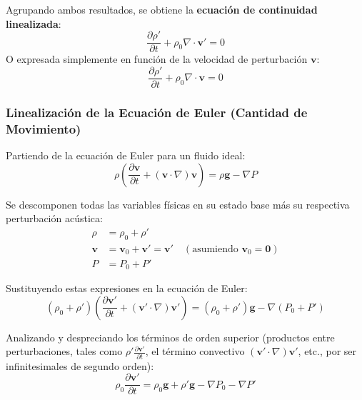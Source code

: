 \documentclass[11pt,letterpaper]{article}
\begin{document}
Agrupando ambos resultados, se obtiene la \textbf{ecuación de continuidad linealizada}:
\begin{equation}
    \frac{\partial \rho'}{\partial t} + \rho_0 \nabla \cdot \mathbf{v}' = 0
\end{equation}
O expresada simplemente en función de la velocidad de perturbación $\mathbf{v}$:
\begin{equation}
    \frac{\partial \rho'}{\partial t} + \rho_0 \nabla \cdot \mathbf{v} = 0
\end{equation}

\subsubsection{Linealización de la Ecuación de Euler (Cantidad de Movimiento)}\label{sec:euler-linealizado}

Partiendo de la ecuación de Euler para un fluido ideal:
\begin{equation}
    \rho \left( \frac{\partial \mathbf{v}}{\partial t} + (\mathbf{v} \cdot \nabla)\mathbf{v} \right) = \rho \mathbf{g} - \nabla P
\end{equation}

Se descomponen todas las variables físicas en su estado base más su respectiva perturbación acústica:
\begin{align}
    \rho &= \rho_0 + \rho' \\
    \mathbf{v} &= \mathbf{v}_0 + \mathbf{v}' = \mathbf{v}' \quad (\text{asumiendo } \mathbf{v}_0 = \mathbf{0}) \\
    P &= P_0 + P'
\end{align}

Sustituyendo estas expresiones en la ecuación de Euler:
\begin{equation}
    (\rho_0 + \rho') \left( \frac{\partial \mathbf{v}'}{\partial t} + (\mathbf{v}' \cdot \nabla)\mathbf{v}' \right) = (\rho_0 + \rho') \mathbf{g} - \nabla (P_0 + P')
\end{equation}

Analizando y despreciando los términos de orden superior (productos entre perturbaciones, tales como $\rho' \frac{\partial \mathbf{v}'}{\partial t}$, el término convectivo $(\mathbf{v}' \cdot \nabla)\mathbf{v}'$, etc., por ser infinitesimales de segundo orden):
\begin{equation}
    \rho_0 \frac{\partial \mathbf{v}'}{\partial t} = \rho_0 \mathbf{g} + \rho'\mathbf{g} - \nabla P_0 - \nabla P'
\end{equation}
\end{document}
